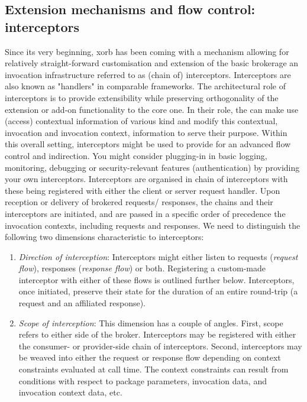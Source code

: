  \subsection{Extension mechanisms and flow control: interceptors}\label{sec:interceptors}
Since its very beginning, xorb has been coming with a mechanism allowing for relatively straight-forward customisation and extension of the basic brokerage an invocation infrastructure referred to as (chain of) interceptors. Interceptors are also known as "handlers" in comparable frameworks. The architectural role of interceptors is to provide extensibility while preserving orthogonality of the extension or add-on functionality to the core one. In their role, the can make use (access) contextual information of various kind and modify this contextual, invocation and invocation context, information to serve their purpose. Within this overall setting, interceptors might be used to provide for an advanced flow control and indirection. You might consider plugging-in in basic logging, monitoring, debugging or
security-relevant features (authentication) by providing your own interceptors. Interceptors are organised in chain of interceptors with these being registered with either the client or server request handler. Upon reception or delivery of brokered requests/ responses, the chains and their interceptors are initiated, and are passed in a specific order of precedence the invocation contexts, including requests and responses. We need to distinguish the following two dimensions characteristic to interceptors:
\begin{enumerate}
\item \emph{Direction of interception}: Interceptors might either listen to requests (\emph{request flow}), responses (\emph{response flow}) or both. Registering a custom-made interceptor with either of these flows is outlined further below. Interceptors, once initiated, preserve their state for the duration of an entire round-trip (a request and an affiliated response).
\item \emph{Scope of interception}: This dimension has a couple of angles. First, scope refers to either side of the broker. Interceptors may be registered with either the consumer- or provider-side chain of interceptors. Second, interceptors may be weaved into either the request or response flow depending on context constraints evaluated at call time. The context constraints can result from conditions with respect to package parameters, invocation data, and invocation context data, etc.
\end{enumerate}
